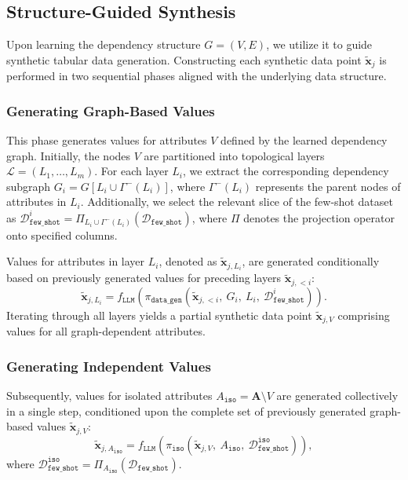 \subsection{Structure-Guided Synthesis}
\label{sec:synth}

Upon learning the dependency structure $G=(V, E)$, we utilize it to guide synthetic tabular data generation. Constructing each synthetic data point $\tilde{\mathbf{x}}_j$ is performed in two sequential phases aligned with the underlying data structure.

\subsubsection{Generating Graph-Based Values}

This phase generates values for attributes $V$ defined by the learned dependency graph. Initially, the nodes $V$ are partitioned into topological layers $\mathcal{L} = (L_1, \dots, L_m)$. For each layer $L_i$, we extract the corresponding dependency subgraph $G_i = G[L_i \cup \Gamma^{-}(L_i)]$, where $\Gamma^{-}(L_i)$ represents the parent nodes of attributes in $L_i$. Additionally, we select the relevant slice of the few-shot dataset as $\mathcal{D}_{\mathtt{few\_shot}}^i = \Pi_{L_i \cup \Gamma^{-}(L_i)}(\mathcal{D}_{\mathtt{few\_shot}})
$, where $\Pi$ denotes the projection operator onto specified columns.

Values for attributes in layer $L_i$, denoted as $\tilde{\mathbf{x}}_{j, L_i}$, are generated conditionally based on previously generated values for preceding layers $\tilde{\mathbf{x}}_{j, <i}$:
\begin{equation}
\tilde{\mathbf{x}}_{j, L_i} = f_{\mathtt{LLM}}\left(\pi_{\mathtt{data\_gen}}\left( \tilde{\mathbf{x}}_{j, <i},\ G_i,\ L_i,\ \mathcal{D}_{\mathtt{few\_shot}}^i\right)\right).
\end{equation}
Iterating through all layers yields a partial synthetic data point $\tilde{\mathbf{x}}_{j, V}$ comprising values for all graph-dependent attributes.

\subsubsection{Generating Independent Values}

Subsequently, values for isolated attributes $A_{\mathtt{iso}} = \mathbf{A} \setminus V$ are generated collectively in a single step, conditioned upon the complete set of previously generated graph-based values $\tilde{\mathbf{x}}_{j, V}$:
\begin{equation}
\tilde{\mathbf{x}}_{j, A_{\mathtt{iso}}} = f_{\mathtt{LLM}}\left(\pi_{\mathtt{iso}}\left(\tilde{\mathbf{x}}_{j, V},\ A_{\mathtt{iso}},\ \mathcal{D}_{\mathtt{few\_shot}}^{\mathtt{iso}}\right)\right),
\end{equation}
where $\mathcal{D}_{\mathtt{few\_shot}}^{\mathtt{iso}} = \Pi_{A_{\mathtt{iso}}}(\mathcal{D}_{\mathtt{few\_shot}}).$

